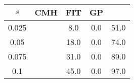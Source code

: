 \centering \begin{tabular}{c|c|c|c|c}
$s$	&CMH	&FIT	&GP	&\sc{Clear}\\\hline
0.025	&	&8.0	&0.0	&51.0\\
0.05	&	&18.0	&0.0	&74.0\\
0.075	&	&31.0	&0.0	&89.0\\
0.1	&	&45.0	&0.0	&97.0\\
\end{tabular}
